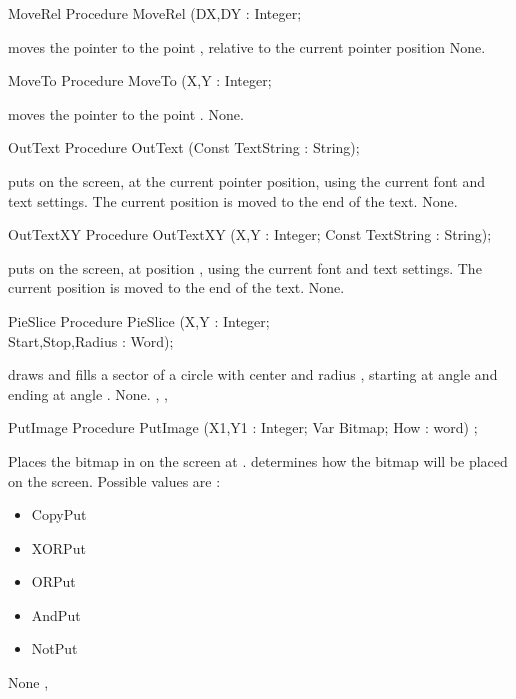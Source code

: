 \begin{procedure}{MoveRel}
\Declaration
Procedure MoveRel (DX,DY : Integer;

\Description
{} moves the pointer to the
point , relative to the current pointer
position
\Errors
None.
\SeeAlso
{}
\end{procedure}
\begin{procedure}{MoveTo}
\Declaration
Procedure MoveTo (X,Y : Integer;

\Description
{} moves the pointer to the
point .
\Errors
None.
\SeeAlso
{}
\end{procedure}
\begin{procedure}{OutText}
\Declaration
Procedure OutText (Const TextString : String);

\Description
{} puts  on the screen, at the current pointer
position, using the current font and text settings. The current position is
moved to the end of the text.
\Errors
None.
\SeeAlso
{}
\end{procedure}
\begin{procedure}{OutTextXY}
\Declaration
Procedure OutTextXY (X,Y : Integer; Const TextString : String);

\Description
{} puts  on the screen, at position ,
using the current font and text settings. The current position is
moved to the end of the text.
\Errors
None.
\SeeAlso
{}
\end{procedure}
\begin{procedure}{PieSlice}
\Declaration
Procedure PieSlice (X,Y : Integer; \\ Start,Stop,Radius : Word);

\Description
{}
draws and fills a sector of a circle with center  and radius 
, starting at angle  and ending at angle .
\Errors
None.
\SeeAlso
{}, , 
\end{procedure}
\begin{procedure}{PutImage}
\Declaration
Procedure PutImage (X1,Y1 : Integer; Var Bitmap; How : word) ;

\Description
{}
Places the bitmap in  on the screen at . 
determines how the bitmap will be placed on the screen. Possible values are :
\begin{itemize}
\item CopyPut
\item XORPut
\item ORPut
\item AndPut
\item NotPut
\end{itemize}
\Errors
None
\SeeAlso
{},
\end{procedure}
